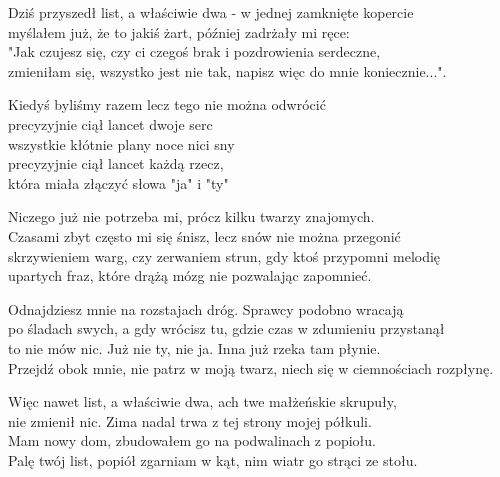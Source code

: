 \begin{text}
    Dziś przyszedł list, a właściwie dwa - w jednej zamknięte kopercie\\
    myślałem już, że to jakiś żart, później zadrżały mi ręce:\\
    "Jak czujesz się, czy ci czegoś brak i pozdrowienia serdeczne,\\
    zmieniłam się, wszystko jest nie tak, napisz więc do mnie koniecznie...".

    Kiedyś byliśmy razem lecz tego nie można odwrócić\\
    precyzyjnie ciął lancet dwoje serc\\
    wszystkie kłótnie plany noce nici sny\\
    precyzyjnie ciął lancet każdą rzecz,\\
    która miała złączyć słowa "ja" i "ty"

    Niczego już nie potrzeba mi, prócz kilku twarzy znajomych.\\
    Czasami zbyt często mi się śnisz, lecz snów nie można przegonić\\
    skrzywieniem warg, czy zerwaniem strun, gdy ktoś przypomni melodię\\
    upartych fraz, które drążą mózg nie pozwalając zapomnieć.

    Odnajdziesz mnie na rozstajach dróg. Sprawcy podobno wracają\\
    po śladach swych, a gdy wrócisz tu, gdzie czas w zdumieniu przystanął\\
    to nie mów nic. Już nie ty, nie ja. Inna już rzeka tam płynie.\\
    Przejdź obok mnie, nie patrz w moją twarz, niech się w ciemnościach rozpłynę.

    Więc nawet list, a właściwie dwa, ach twe małżeńskie skrupuły,\\
    nie zmienił nic. Zima nadal trwa z tej strony mojej półkuli.\\
    Mam nowy dom, zbudowałem go na podwalinach z popiołu.\\
    Palę twój list, popiół zgarniam w kąt, nim wiatr go strąci ze stołu.
\end{text}
\begin{chord}

\end{chord}